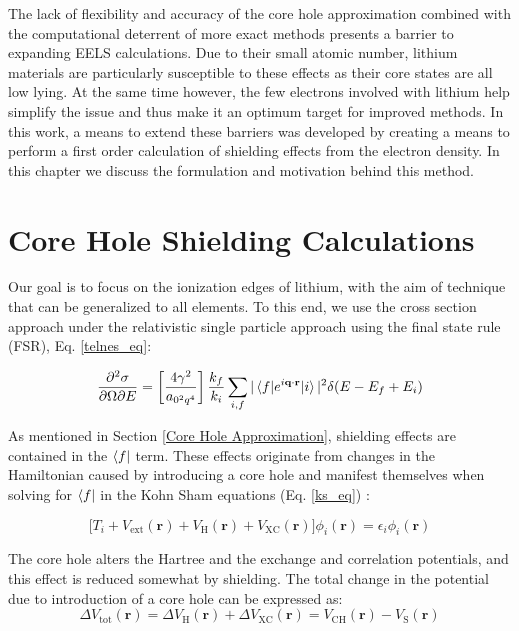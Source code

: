 




The lack of flexibility and accuracy of the core hole approximation combined with the computational deterrent of more exact methods presents a barrier to expanding EELS calculations.  Due to their small atomic number, lithium materials are particularly susceptible to these effects as their core states are all low lying.  At the same time however, the few electrons involved with lithium help simplify the issue and thus make it an optimum target for improved methods.  In this work, a means to extend these barriers was developed by creating a means to perform a first order calculation of shielding effects from the electron density.   In this chapter we discuss the formulation and motivation behind this method. 

\section{Core Hole Shielding Calculations}
Our goal is to focus on the ionization edges of lithium, with the aim of technique that can be generalized to all elements.  To this end, we use the cross section approach under the relativistic single particle approach using the final state rule (FSR), Eq. \ref{telnes_eq}\cite{jorissen2007ab}:

\begin{equation}
	\frac{\partial^2 \sigma}{\partial \Omega \partial E} = \left[\frac{4\gamma^2}{a_{\mathrm{0}^2q^4}}\right] \frac{k_f}{k_i} \sum_{i,f}|\mel{f}{e^{i\textbf{q}\cdot\textbf{r}}}{i}|^2\delta(E-E_f+E_i)
\end{equation}

As mentioned in Section \ref{Core Hole Approximation}, shielding effects are contained in the $\bra{f}$ term. These effects originate from changes in the Hamiltonian caused by introducing a core hole and manifest themselves when solving for $\bra{f}$ in the Kohn Sham equations (Eq. \ref{ks_eq}) \cite{kohn_self-consistent_1965}:  

\begin{equation}
    \bigg[T_i + V_{\mathrm{ext}}(\textbf{r}) + V_{\mathrm{H}}(\textbf{r}) + V_{\mathrm{XC}}(\textbf{r})\bigg] \phi_i(\textbf{r}) = \epsilon_i \phi_i(\textbf{r})
\end{equation}

The core hole alters the Hartree and the exchange and correlation potentials, and this effect is reduced somewhat by shielding.  The total change in the potential due to introduction of a core hole can be expressed as: 
\begin{equation}
\Delta V_{\mathrm{tot}}(\textbf{r})=\Delta V_{\mathrm{H}}(\textbf{r}) +\Delta V_{\mathrm{XC}}(\textbf{r})=V_{\mathrm{CH}}(\textbf{r}) - V_{\mathrm{S}}(\textbf{r})
\label{delta_potentials}
\end{equation}

